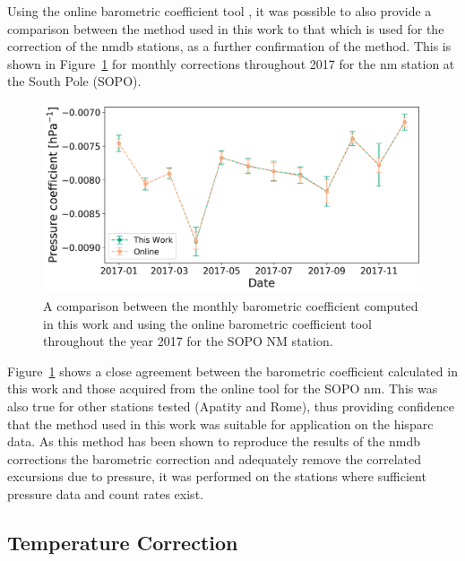 Using the online barometric coefficient tool \citep{paschalis_online_2013}, it was possible to also provide a comparison between the method used in this work to that which is used for the correction of the \gls{nmdb} stations, as a further confirmation of the method. This is shown in Figure~\ref{fig:NM_beta_variation} for monthly corrections throughout 2017 for the \gls{nm} station at the South Pole (SOPO).

\begin{figure}[ht!]
	\centering
	\includegraphics[width=0.65\columnwidth]{SOPO_beta_2017_rescale.png}
	\caption{A comparison between the monthly barometric coefficient computed in this work and using the online barometric coefficient tool throughout the year 2017 for the SOPO NM station.}
	\label{fig:NM_beta_variation}
\end{figure}


Figure~\ref{fig:NM_beta_variation} shows a close agreement between the barometric coefficient calculated in this work and those acquired from the online tool for the SOPO \gls{nm}. This was also true for other stations tested (Apatity and Rome), thus providing confidence that the method used in this work was suitable for application on the \gls{hisparc} data. As this method has been shown to reproduce the results of the \gls{nmdb} corrections the barometric correction and adequately remove the correlated excursions due to pressure, it was performed on the stations where sufficient pressure data and count rates exist. %





\subsection{Temperature Correction}\label{sec:HS_T_corr}

